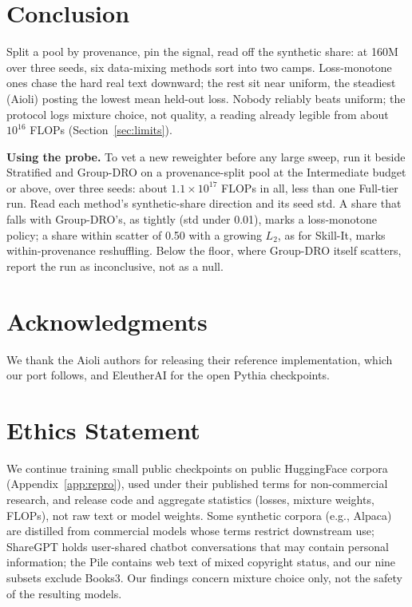 \documentclass{article}
\begin{document}
\section{Conclusion}

Split a pool by provenance, pin the signal, read off the synthetic share: at 160M over three seeds, six data-mixing methods sort into two camps. Loss-monotone ones chase the hard real text downward; the rest sit near uniform, the steadiest (Aioli) posting the lowest mean held-out loss. Nobody reliably beats uniform; the protocol logs mixture choice, not quality, a reading already legible from about $10^{16}$ FLOPs (Section~\ref{sec:limits}).

\textbf{Using the probe.} To vet a new reweighter before any large sweep, run it beside Stratified and Group-DRO on a provenance-split pool at the Intermediate budget or above, over three seeds: about $1.1\times10^{17}$ FLOPs in all, less than one Full-tier run. Read each method's synthetic-share direction and its seed std. A share that falls with Group-DRO's, as tightly (std under 0.01), marks a loss-monotone policy; a share within scatter of 0.50 with a growing $L_2$, as for Skill-It, marks within-provenance reshuffling. Below the floor, where Group-DRO itself scatters, report the run as inconclusive, not as a null.

\section*{Acknowledgments}
We thank the Aioli authors for releasing their reference implementation, which our port follows, and EleutherAI for the open Pythia checkpoints.

\section*{Ethics Statement}
We continue training small public checkpoints on public HuggingFace corpora (Appendix~\ref{app:repro}), used under their published terms for non-commercial research, and release code and aggregate statistics (losses, mixture weights, FLOPs), not raw text or model weights. Some synthetic corpora (e.g., Alpaca) are distilled from commercial models whose terms restrict downstream use; ShareGPT holds user-shared chatbot conversations that may contain personal information; the Pile contains web text of mixed copyright status, and our nine subsets exclude Books3. Our findings concern mixture choice only, not the safety of the resulting models.
\end{document}
